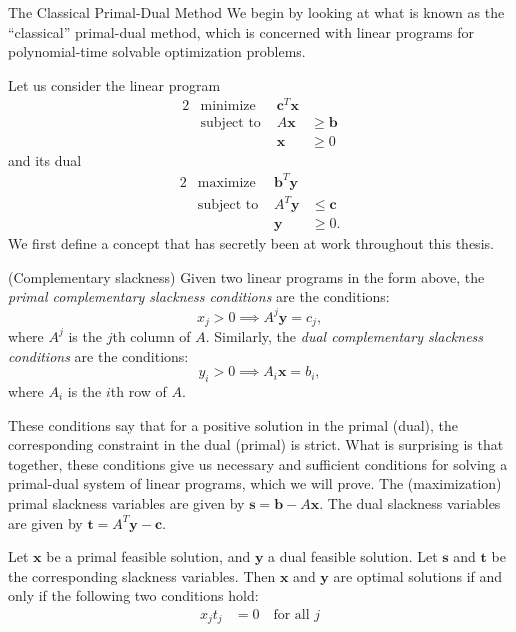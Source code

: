 \begin{section}{The Classical Primal-Dual Method}
	We begin by looking at what is known as the ``classical'' primal-dual method, which is concerned 
	with linear programs for polynomial-time solvable optimization problems.

	Let us consider the linear program
	\begin{alignat}{2}
		& \text{minimize} & \mathbf{c}^{T}\mathbf{x} \\
		& \text{subject to } & A\mathbf{x} & \geq \mathbf{b} \\
		&& \mathbf{x} & \geq 0
	\end{alignat}
	and its dual
	\begin{alignat}{2}
		& \text{maximize} & \mathbf{b}^{T}\mathbf{y} \\
		& \text{subject to } & A^{T}\mathbf{y} & \leq \mathbf{c} \\
		&& \mathbf{y} & \geq 0.
	\end{alignat}
	We first define a concept that has secretly been at work throughout this thesis. 
	\begin{definition}{(Complementary slackness)}
		Given two linear programs in the form above, the \emph{primal complementary slackness 
		conditions} are the conditions:
		\[
			x_j > 0 \implies A^{j}\mathbf{y} = c_j,
		\]
		where $A^{j}$ is the $j$th column of $A$. Similarly, the \emph{dual complementary 
		slackness conditions} are the conditions:
		\[
			y_i > 0 \implies A_i\mathbf{x} = b_i,
		\]
		where $A_i$ is the $i$th row of $A$. 
	\end{definition}
		These conditions say that for a positive solution in the primal (dual), the corresponding 
		constraint in the dual (primal) is strict. What is surprising is that
		together, these conditions give us necessary and 
		sufficient conditions for solving a primal-dual system of linear programs, 
		which we will prove. The (maximization) primal slackness variables are given by 
		$\mathbf{s} = \mathbf{b} - A\mathbf{x}$. The dual slackness variables are given by 
		$\mathbf{t} = A^{T}\mathbf{y} - \mathbf{c}$.
	\begin{theorem}
		Let $\mathbf{x}$ be a primal feasible solution, and $\mathbf{y}$ a dual feasible 
		solution. Let $\mathbf{s}$ and $\mathbf{t}$ be the corresponding slackness variables. 
		Then $\mathbf{x}$ and $\mathbf{y}$ are optimal solutions if and only if the following 
		two conditions hold:
		\begin{align}
			x_jt_j &= 0 \quad \text{for all } j \\

\end{align}
\end{theorem}
\end{section}
